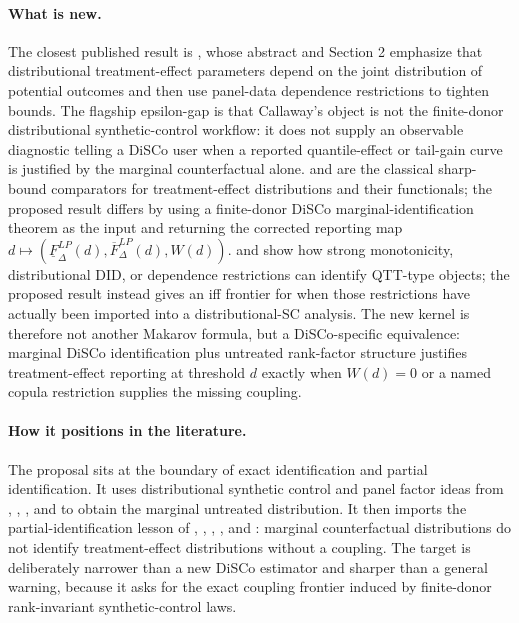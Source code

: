 \documentclass[11pt]{article}
\theoremstyle{definition}
\theoremstyle{plain}
\theoremstyle{remark}
\begin{document}
\paragraph{What is new.}
The closest published result is \cite{Callaway2021BoundsDTEPanel}, whose abstract and Section 2 emphasize that distributional treatment-effect parameters depend on the joint distribution of potential outcomes and then use panel-data dependence restrictions to tighten bounds.  The flagship epsilon-gap is that Callaway's object is not the finite-donor distributional synthetic-control workflow: it does not supply an observable diagnostic telling a DiSCo user when a reported quantile-effect or tail-gain curve is justified by the marginal counterfactual alone.  \cite{FanPark2010SharpBounds} and \cite{FirpoRidder2019Functionals} are the classical sharp-bound comparators for treatment-effect distributions and their functionals; the proposed result differs by using a finite-donor DiSCo marginal-identification theorem as the input and returning the corrected reporting map \(d\mapsto(\underline F_\Delta^{LP}(d),\overline F_\Delta^{LP}(d),W(d))\).  \cite{AtheyImbens2006CIC} and \cite{CallawayLi2019QTEDID} show how strong monotonicity, distributional DID, or dependence restrictions can identify QTT-type objects; the proposed result instead gives an iff frontier for when those restrictions have actually been imported into a distributional-SC analysis.  The new kernel is therefore not another Makarov formula, but a DiSCo-specific equivalence: marginal DiSCo identification plus untreated rank-factor structure justifies treatment-effect reporting at threshold \(d\) exactly when \(W(d)=0\) or a named copula restriction supplies the missing coupling.

\paragraph{How it positions in the literature.}
The proposal sits at the boundary of exact identification and partial identification.  It uses distributional synthetic control and panel factor ideas from \cite{Gunsilius2023DiSCo}, \cite{Chen2020DistributionalSC}, \cite{Bai2009IFE}, and \cite{Masini2025DCA} to obtain the marginal untreated distribution.  It then imports the partial-identification lesson of \cite{FanYu2012PartialDID}, \cite{FanPark2010SharpBounds}, \cite{FirpoRidder2019Functionals}, \cite{CallawayLi2019QTEDID}, and \cite{Callaway2021BoundsDTEPanel}: marginal counterfactual distributions do not identify treatment-effect distributions without a coupling.  The target is deliberately narrower than a new DiSCo estimator and sharper than a general warning, because it asks for the exact coupling frontier induced by finite-donor rank-invariant synthetic-control laws.
\end{document}
